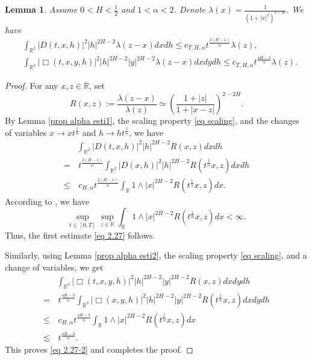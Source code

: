 \documentclass[11pt,reqno]{amsart}
\numberwithin{equation}{section}
\newtheorem{lemma}{Lemma}[section]
\newcommand{\1}{{\bf 1}}
\newcommand{\2}{{\bf 2}}
\begin{document}
\begin{lemma}\label{lem 2.12} Assume $0<H<\frac12$ and $1<\alpha<2$. Denote $\lambda(x)=\frac{1}{(1+|x|^2)^{1-H}}$.  We have
\begin{align} 
&\int_{\mathbb{R}^2}\left|D(t,x,h)\right|^2|h|^{2H-2}\lambda(z-x)dxdh\le c_{T,H,\alpha}t^{\frac{2(H-1)}{\alpha}}\lambda(z), \label{eq 2.27}\\
&\int_{\mathbb{R}^3}\left|\Box(t,x,y,h)\right|^2|h|^{2H-2}|y|^{2H-2}\lambda(z-x)dxdydh\le c_{T,H,\alpha}t^{\frac{4H-3}{\alpha}}\lambda(z). \label{eq 2.27-2}
\end{align}
\end{lemma}
\begin{proof}
For any $x, z\in \mathbb R$,  set
$$
R(x,z):=\frac{\lambda(z-x)}{\lambda(z)}\simeq \left(\frac{1+|z|}{1+|x-z|}\right)^{2-2H}.
$$
By Lemma \ref{prop alpha esti1},  the scaling property \eqref{eq scaling},   and the changes of variables $x\to xt^{\frac1{\alpha}}$ and $h\to ht^{\frac1{\alpha}}$, we have
\begin{equation*}%
\begin{split}
& \int_{\mathbb{R}^2}\left|D(t,x,h)\right|^2|h|^{2H-2}R(x,z)dxdh \\
=&\, t^{\frac{2(H-1)}{\alpha}}\int_{\mathbb{R}^2}\left|D(x,h)\right|^2|h|^{2H-2}R\left(t^{\frac1{\alpha}}x, z\right)dxdh \\
 \le &\, c_{H,\alpha}t^{\frac{2(H-1)}{\alpha}}\int_{\mathbb{R}}1\wedge |x|^{2H-2} R\left(t^{\frac1{\alpha}}x, z\right)dx.
\end{split}
\end{equation*}
 According to  \cite[(2.30)]{HW2022}, we have
$$
\sup_{t\in[0,T]}\sup_{z\in\mathbb{R}}\int_{\mathbb{R}}1\wedge |x|^{2H-2} R\left(t^{\frac1{\alpha}}x, z\right)dx<\infty.
$$
Thus, the first estimate \eqref{eq 2.27} follows.

 Similarly, using  Lemma \ref{prop alpha esti2}, the scaling property \eqref{eq scaling}, and a change of variables, we get
\begin{equation*}%
\begin{split}
&\int_{\mathbb{R}^3}\left|\Box(t,x,y,h)\right|^2|h|^{2H-2}|y|^{2H-2}R(x,z)dxdydh \\
 =&\, t^{\frac{4H-3}{\alpha}}\int_{\mathbb{R}^3}\left|\Box(x,y,h)\right|^2|h|^{2H-2}|y|^{2H-2}R\left(t^{\frac1{\alpha}}x, z\right)dxdydh \\
 \le &\,  c_{H,\alpha}t^{\frac{4H-3}{\alpha}}\int_{\mathbb{R}}1\wedge |x|^{2H-2} R\left(t^{\frac1{\alpha}}x, z\right)dx \\
 \lesssim &\, t^{\frac{4H-3}{\alpha}}. 
\end{split}
\end{equation*}
This proves \eqref{eq 2.27-2} and completes the proof.
\end{proof}
\end{document}
